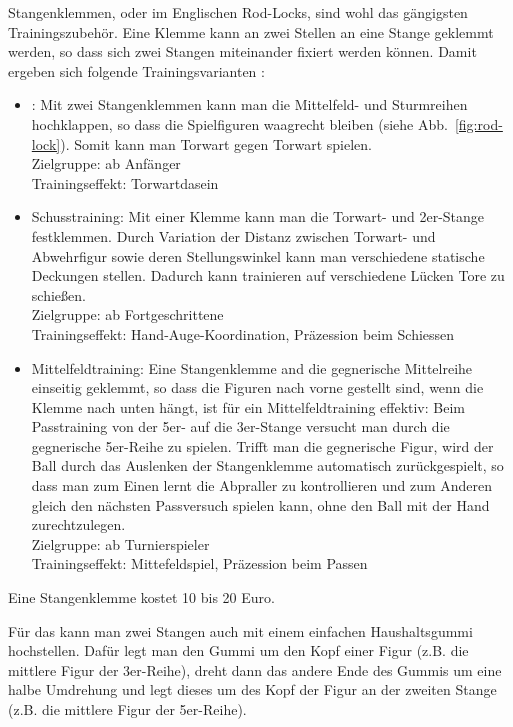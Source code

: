 Stangenklemmen, oder im Englischen Rod-Locks, sind wohl das gängigsten Trainingszubehör. 
Eine Klemme kann an zwei Stellen an eine Stange geklemmt werden, so dass sich zwei Stangen miteinander fixiert werden können. 
Damit ergeben sich folgende Trainingsvarianten \citep{www:rod-lock}:
\begin{itemize}
\item {}: Mit zwei Stangenklemmen kann man die Mittelfeld- und Sturmreihen hochklappen, so dass die Spielfiguren waagrecht bleiben (siehe Abb.~\ref{fig:rod-lock}). 
Somit kann man Torwart gegen Torwart spielen. 
\\
Zielgruppe: ab Anfänger
\\
Trainingseffekt: Torwartdasein
\item Schusstraining: Mit einer Klemme kann man die Torwart- und 2er-Stange festklemmen. 
Durch Variation der Distanz zwischen Torwart- und Abwehrfigur sowie deren Stellungswinkel kann man verschiedene statische Deckungen stellen.
Dadurch kann trainieren auf verschiedene Lücken Tore zu schießen.  
\\
Zielgruppe: ab Fortgeschrittene
\\
Trainingseffekt: Hand-Auge-Koordination, Präzession beim Schiessen
\item Mittelfeldtraining: Eine Stangenklemme and die gegnerische Mittelreihe einseitig geklemmt, so dass die Figuren nach vorne gestellt sind, wenn die Klemme nach unten hängt, ist für ein Mittelfeldtraining effektiv:
Beim Passtraining von der 5er- auf die 3er-Stange versucht man durch die gegnerische 5er-Reihe zu spielen. 
Trifft man die gegnerische Figur, wird der Ball durch das Auslenken der Stangenklemme automatisch zurückgespielt, so dass man zum Einen lernt die Abpraller zu kontrollieren und zum Anderen gleich den nächsten Passversuch spielen kann, ohne den Ball mit der Hand zurechtzulegen.
\\
Zielgruppe: ab Turnierspieler
\\
Trainingseffekt: Mittefeldspiel, Präzession beim Passen
\end{itemize}
Eine Stangenklemme kostet 10 bis 20 Euro.

Für das  kann man zwei Stangen auch mit einem einfachen Haushaltsgummi hochstellen.
Dafür legt man den Gummi um den Kopf einer Figur (z.B. die mittlere Figur der 3er-Reihe), dreht dann das andere Ende des Gummis um eine halbe Umdrehung und legt dieses um des Kopf der Figur an der zweiten Stange (z.B. die mittlere Figur der 5er-Reihe). 

